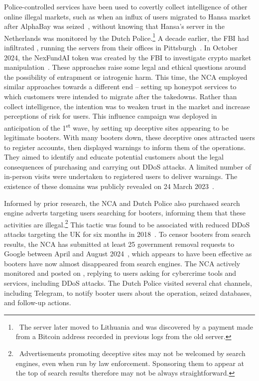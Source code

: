 \documentclass[letterpaper,twocolumn,10pt]{article}
\begin{document}
Police-controlled services have been used to covertly collect intelligence of other online illegal markets, such as when an influx of users migrated to Hansa market after AlphaBay was seized~\cite{hansainflux}, without knowing that Hansa's server in the Netherlands was monitored by the Dutch Police.\footnote{~The server later moved to Lithuania and was discovered by a payment made from a Bitcoin address recorded in previous logs from the old server.} A decade earlier, the FBI had infiltrated \darkmarket, running the servers from their offices in Pittsburgh~\cite{glenny2011darkmarket}. In October 2024, the NexFundAI token was created by the FBI to investigate crypto market manipulation~\cite{fbinexfundai}. These approaches raise some legal and ethical questions around the possibility of entrapment or iatrogenic harm. This time, the NCA employed similar approaches towards a different end -- setting up honeypot services to which customers were intended to migrate after the takedowns. Rather than collect intelligence, the intention was to weaken trust in the market and increase perceptions of risk for users. This influence campaign was deployed in anticipation of the 1\textsuperscript{st} wave, by setting up deceptive sites appearing to be legitimate booters. With many booters down, these deceptive ones attracted users to register accounts, then displayed warnings to inform them of the operations. They aimed to identify and educate potential customers about the legal consequences of purchasing and carrying out DDoS attacks. A limited number of in-person visits were undertaken to registered users to deliver warnings. The existence of these domains was publicly revealed on 24 March 2023~\cite{ncarevealsfakebooters}.

Informed by prior research, the NCA and Dutch Police also purchased search engine adverts targeting users searching for booters, informing them that these activities are illegal.\footnote{~Advertisements promoting deceptive sites may not be welcomed by search engines, even when run by law enforcement. Sponsoring them to appear at the top of search results therefore may not be always straightforward.} This tactic was found to be associated with reduced DDoS attacks targeting the UK for six months in 2018~\cite{collier2019booting}. To censor booters from search results, the NCA has submitted at least 25 government removal requests to Google between April and August 2024~\cite{ncalumendatabase}, which appears to have been effective as booters have now almost disappeared from search engines. The NCA actively monitored and posted on \hackforums, replying to users asking for cybercrime tools and services, including DDoS attacks. The Dutch Police visited several chat channels, including Telegram, to notify booter users about the operation, seized databases, and follow-up actions.
\end{document}
